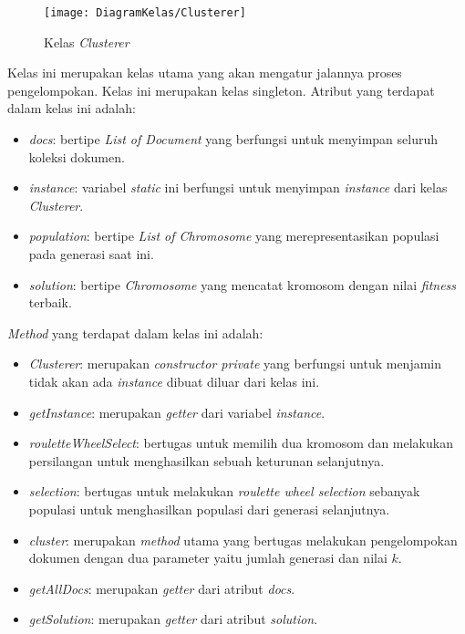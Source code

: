\begin{figure}[h]
	\begin{center}
		\texttt{[image: DiagramKelas/Clusterer]}
		\caption{Kelas \textit{Clusterer}}
		\label{fig:kelasClusterer}
	\end{center}
\end{figure}

Kelas ini merupakan kelas utama yang akan mengatur jalannya proses pengelompokan. Kelas ini merupakan kelas singleton. Atribut yang terdapat dalam kelas ini adalah:

\begin{itemize}
	\item \textit{docs}: bertipe \textit{List of Document} yang berfungsi untuk menyimpan seluruh koleksi dokumen.
	\item \textit{instance}: variabel \textit{static} ini berfungsi untuk menyimpan \textit{instance} dari kelas \textit{Clusterer}.
	\item \textit{population}: bertipe \textit{List of Chromosome} yang merepresentasikan populasi pada generasi saat ini.
	\item \textit{solution}: bertipe \textit{Chromosome} yang mencatat kromosom dengan nilai \textit{fitness} terbaik.
\end{itemize}

\textit{Method} yang terdapat dalam kelas ini adalah:

\begin{itemize}
	\item \textit{Clusterer}: merupakan \textit{constructor private} yang berfungsi untuk menjamin tidak akan ada \textit{instance} dibuat diluar dari kelas ini.
	\item \textit{getInstance}: merupakan \textit{getter} dari variabel \textit{instance}.
	\item \textit{rouletteWheelSelect}: bertugas untuk memilih dua kromosom dan melakukan persilangan untuk menghasilkan sebuah keturunan selanjutnya.
	\item \textit{selection}: bertugas untuk melakukan \textit{roulette wheel selection} sebanyak populasi untuk menghasilkan populasi dari generasi selanjutnya.
	\item \textit{cluster}: merupakan \textit{method} utama yang bertugas melakukan pengelompokan dokumen dengan dua parameter yaitu jumlah generasi dan nilai $k$.
	\item \textit{getAllDocs}: merupakan \textit{getter} dari atribut \textit{docs}.
	\item \textit{getSolution}: merupakan \textit{getter} dari atribut \textit{solution}.
\end{itemize}

